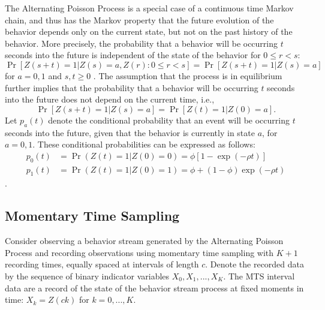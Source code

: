 \documentclass[man, noextraspace, floatsintext]{apa6}\usepackage[]{graphicx}\usepackage[]{color}
\begin{document}
The Alternating Poisson Process is a special case of a continuous time Markov chain, and thus has the Markov property that the future evolution of the behavior depends only on the current state, but not on the past history of the behavior. 
More precisely, the probability that a behavior will be occurring $t$ seconds into the future is independent of the state of the behavior for $0 \leq r < s$: 
\begin{equation}
\label{eq:Markov}
\Pr\left[Z(s + t) = 1 \left| Z(s) = a, Z(r): 0 \leq r < s \right.\right] = \Pr\left[ Z(s + t) = 1 \left| Z(s) = a \right.\right]
\end{equation}
for $a = 0,1$ and $s,t \geq 0$ \citep[Thm. 6.1]{Kulkarni2010modeling}. 
The assumption that the process is in equilibrium further implies that the probability that a behavior will be occurring $t$ seconds into the future does not depend on the current time, i.e.,  
\begin{equation}
\label{eq:equilibrium}
\Pr\left[Z(s + t) = 1 \left| Z(s) = a\right.\right] = \Pr\left[ Z(t) = 1 \left| Z(0) = a \right.\right].
\end{equation}
Let $p_a(t)$ denote the conditional probability that an event will be occurring $t$ seconds into the future, given that the behavior is currently in state $a$, for $a = 0,1$. 
These conditional probabilities can be expressed as follows:
\begin{equation}
\begin{aligned}
p_0(t) &= \Pr(Z(t) = 1 | Z(0) = 0) = \phi \left[1 - \exp\left(-\rho t\right)\right] \\
p_1(t) &= \Pr(Z(t) = 1 | Z(0) = 1) = \phi + (1 - \phi) \exp\left(-\rho t\right)
\end{aligned}
\end{equation}
\citep[Eq. 6.17]{Kulkarni2010modeling}.

\subsection{Momentary Time Sampling}
\label{subsec:MTS}

Consider observing a behavior stream generated by the Alternating Poisson Process and recording observations using momentary time sampling with $K + 1$ recording times, equally spaced at intervals of length $c$. 
Denote the recorded data by the sequence of binary indicator variables $X_0,X_1,...,X_K$. The MTS interval data are a record of the state of the behavior stream process at fixed moments in time: $X_k = Z(c k)$ for $k = 0,...,K$. 
\end{document}

